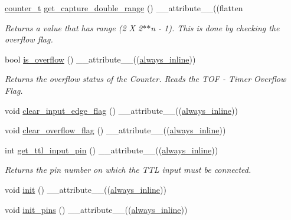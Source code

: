 \begin{DoxyCompactItemize}
\hyperlink{types_8hpp_a22f279793847eba127de149437848c48}{counter\+\_\+t} \hyperlink{classTMR1Controller_a34042b5a735d4f8fd40fa36135bdec8c}{get\+\_\+capture\+\_\+double\+\_\+range} () \+\_\+\+\_\+attribute\+\_\+\+\_\+((flatten
\begin{DoxyCompactList}\small\item\em Returns a value that has range (2 X 2$\ast$$\ast$n -\/ 1). This is done by checking the overflow flag. \end{DoxyCompactList}\item 
bool \hyperlink{classTMR1Controller_a06052b4a881156be3c7a4b6495d8ca11}{is\+\_\+overflow} () \+\_\+\+\_\+attribute\+\_\+\+\_\+((\hyperlink{classTMR1Controller_adce8e8a496510485a88ccc5b88595672}{always\+\_\+inline}))
\begin{DoxyCompactList}\small\item\em Returns the overflow status of the Counter. Reads the T\+OF -\/ Timer Overflow Flag. \end{DoxyCompactList}\item 
void \hyperlink{classTMR1Controller_aa59afefa545098e53cb2e0560142526c}{clear\+\_\+input\+\_\+edge\+\_\+flag} () \+\_\+\+\_\+attribute\+\_\+\+\_\+((\hyperlink{classTMR1Controller_adce8e8a496510485a88ccc5b88595672}{always\+\_\+inline}))
\item 
void \hyperlink{classTMR1Controller_a7117e12d0cb8ec32aa6552fe541023da}{clear\+\_\+overflow\+\_\+flag} () \+\_\+\+\_\+attribute\+\_\+\+\_\+((\hyperlink{classTMR1Controller_adce8e8a496510485a88ccc5b88595672}{always\+\_\+inline}))
\item 
int \hyperlink{classTMR1Controller_a084c153e1a888f72456c54b29e3fa957}{get\+\_\+ttl\+\_\+input\+\_\+pin} () \+\_\+\+\_\+attribute\+\_\+\+\_\+((\hyperlink{classTMR1Controller_adce8e8a496510485a88ccc5b88595672}{always\+\_\+inline}))
\begin{DoxyCompactList}\small\item\em Returns the pin number on which the T\+TL input must be connected. \end{DoxyCompactList}\item 
void \hyperlink{classTMR1Controller_af92315e340766e3857eb6a20e7cab673}{init} () \+\_\+\+\_\+attribute\+\_\+\+\_\+((\hyperlink{classTMR1Controller_adce8e8a496510485a88ccc5b88595672}{always\+\_\+inline}))
\item 
void \hyperlink{classTMR1Controller_a1c5d358760aa98641333f63c7bcacd3a}{init\+\_\+pins} () \+\_\+\+\_\+attribute\+\_\+\+\_\+((\hyperlink{classTMR1Controller_adce8e8a496510485a88ccc5b88595672}{always\+\_\+inline}))

\end{DoxyCompactItemize}
